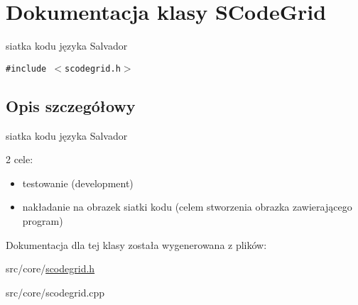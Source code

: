 \hypertarget{classSCodeGrid}{
\section{Dokumentacja klasy SCodeGrid}
\label{classSCodeGrid}
}
siatka kodu języka Salvador  


{\tt \#include $<$scodegrid.h$>$}



\subsection{Opis szczegółowy}
siatka kodu języka Salvador 

2 cele:

\begin{itemize}
\item testowanie (development)\item nakładanie na obrazek siatki kodu (celem stworzenia obrazka zawierającego program) \end{itemize}


Dokumentacja dla tej klasy została wygenerowana z plików:\begin{CompactItemize}
\item 
src/core/\hyperlink{scodegrid_8h}{scodegrid.h}\item 
src/core/scodegrid.cpp\end{CompactItemize}
